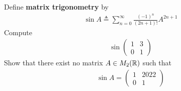 \documentclass{report}
\begin{document}
\begin{question}{}{}
Define \textbf{matrix trigonometry} by 
\begin{align*}
\sin A \triangleq \sum_{n=0}^{\infty} \frac{(-1)^n}{(2n+1)!}A^{2n+1}
\end{align*}
Compute 
\begin{align*}
\sin \begin{pmatrix}
  1 & 3 \\
  0 & 1
\end{pmatrix}
\end{align*}
Show that there exist no matrix $A \in M_{2}(\mathbb{R})$ such that 
\begin{align*}
\sin A = \begin{pmatrix}
 1 & 2022 \\
 0 & 1
\end{pmatrix}
\end{align*}
\end{question}
\end{document}
